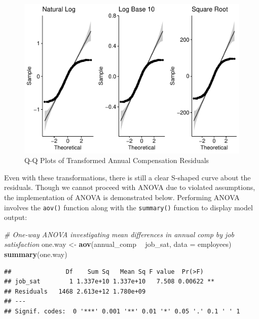\documentclass[]{book}
\newenvironment{Shaded}{\begin{snugshade}}{\end{snugshade}}
\newcommand{\CommentTok}[1]{\textcolor[rgb]{0.56,0.35,0.01}{\textit{#1}}}
\newcommand{\DataTypeTok}[1]{\textcolor[rgb]{0.13,0.29,0.53}{#1}}
\newcommand{\KeywordTok}[1]{\textcolor[rgb]{0.13,0.29,0.53}{\textbf{#1}}}
\newcommand{\NormalTok}[1]{#1}
\newcommand{\OperatorTok}[1]{\textcolor[rgb]{0.81,0.36,0.00}{\textbf{#1}}}
\newcommand{\StringTok}[1]{\textcolor[rgb]{0.31,0.60,0.02}{#1}}
\begin{document}
\begin{figure}

{\centering \includegraphics{The_People_Analytics_Companion_files/figure-latex/qq-plots-trans-1} 

}

\caption{Q-Q Plots of Transformed Annual Compensation Residuals}\label{fig:qq-plots-trans}
\end{figure}

Even with these transformations, there is still a clear S-shaped curve about the residuals. Though we cannot proceed with ANOVA due to violated assumptions, the implementation of ANOVA is demonstrated below. Performing ANOVA involves the \texttt{aov()} function along with the \texttt{summary()} function to display model output:

\begin{Shaded}
\begin{Highlighting}[]
\CommentTok{# One-way ANOVA investigating mean differences in annual comp by job satisfaction}
\NormalTok{one.way <-}\StringTok{ }\KeywordTok{aov}\NormalTok{(annual_comp }\OperatorTok{~}\StringTok{ }\NormalTok{job_sat, }\DataTypeTok{data =}\NormalTok{ employees)}
\KeywordTok{summary}\NormalTok{(one.way)}
\end{Highlighting}
\end{Shaded}

\begin{verbatim}
##               Df    Sum Sq   Mean Sq F value  Pr(>F)   
## job_sat        1 1.337e+10 1.337e+10   7.508 0.00622 **
## Residuals   1468 2.613e+12 1.780e+09                   
## ---
## Signif. codes:  0 '***' 0.001 '**' 0.01 '*' 0.05 '.' 0.1 ' ' 1
\end{verbatim}
\end{document}
